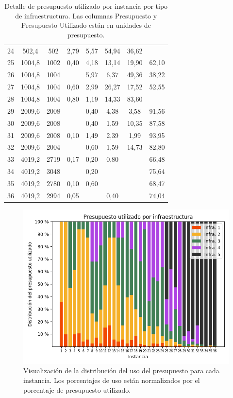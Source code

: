 \documentclass{article}
\begin{document}
\begin{table}
\begin{tabular}{cccccccc}
        24 & 502,4 & 502 & 2,79 & 5,57 & 54,94 & 36,62 &  \\
        25 & 1004,8 & 1002 & 0,40 & 4,18 & 13,14 & 19,90 & 62,10 \\
        26 & 1004,8 & 1004 &  & 5,97 & 6,37 & 49,36 & 38,22 \\
        27 & 1004,8 & 1004 & 0,60 & 2,99 & 26,27 & 17,52 & 52,55 \\
        28 & 1004,8 & 1004 & 0,80 & 1,19 & 14,33 & 83,60 &  \\
        29 & 2009,6 & 2008 &  & 0,40 & 4,38 & 3,58 & 91,56 \\
        30 & 2009,6 & 2008 &  & 0,40 & 1,59 & 10,35 & 87,58 \\
        31 & 2009,6 & 2008 & 0,10 & 1,49 & 2,39 & 1,99 & 93,95 \\
        32 & 2009,6 & 2004 &  & 0,60 & 1,59 & 14,73 & 82,80 \\
        33 & 4019,2 & 2719 & 0,17 & 0,20 & 0,80 &  & 66,48 \\
        34 & 4019,2 & 3048 &  & 0,20 &  &  & 75,64 \\
        35 & 4019,2 & 2780 & 0,10 & 0,60 &  &  & 68,47 \\
        36 & 4019,2 & 2994 & 0,05 &  & 0,40 &  & 74,04 \\
        \bottomrule
    \end{tabular}
      \caption{Detalle de presupuesto utilizado por instancia por tipo de infraestructura. Las columnas Presupuesto y Presupuesto Utilizado están en unidades de presupuesto.} \label{table:sensibilitybudgetusage}
  \end{table}

  \begin{figure}[h!]
    \centering
    \includegraphics[width=12cm]{../resources/budget_use_by_infra.png}
      \caption{Visualización de la distribución del uso del presupuesto para cada instancia. Los porcentajes de uso están normalizados por el porcentaje de presupuesto utilizado.}
    \label{fig:sensibilitybudgetusage}
  \end{figure}
\end{document}
